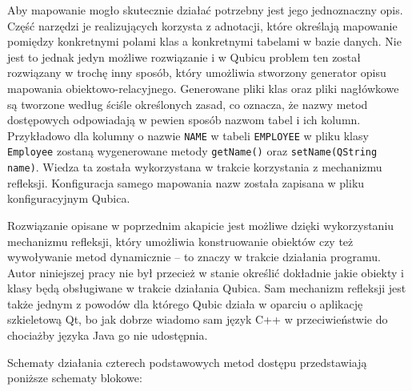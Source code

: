 \documentclass[12pt]{report}
\begin{document}
Aby mapowanie mogło skutecznie działać potrzebny jest jego jednoznaczny opis. Część narzędzi je realizujących korzysta z adnotacji, które określają mapowanie pomiędzy
konkretnymi polami klas a konkretnymi tabelami w bazie danych. Nie jest to jednak jedyn możliwe rozwiązanie i w Qubicu problem ten został rozwiązany w trochę inny sposób,
który umożliwia stworzony generator opisu mapowania obiektowo-relacyjnego. Generowane pliki klas oraz pliki nagłówkowe są tworzone według ściśle określonych zasad, 
co oznacza, że nazwy metod dostępowych odpowiadają w pewien sposób nazwom tabel i ich kolumn. Przykładowo dla kolumny o nazwie {\tt NAME} w tabeli {\tt EMPLOYEE} 
w pliku klasy {\tt Employee} zostaną wygenerowane metody {\tt getName()} oraz {\tt setName(QString name)}. Wie\-dza ta została wykorzystana w trakcie korzystania z 
mechanizmu refleksji. Konfiguracja samego mapowania nazw została zapisana w pliku konfiguracyjnym Qubica.

Rozwiązanie opisane w poprzednim akapicie jest możliwe dzięki wykorzystaniu mechanizmu refleksji, który umożliwia konstruowanie obiektów czy też wywoływanie metod
dynamicznie -- to znaczy w trakcie działania programu. Autor niniejszej pracy nie był przecież w stanie określić dokładnie jakie obiekty i klasy będą obsługiwane w trakcie działania
Qubica. Sam mechanizm refleksji jest także jednym z powodów dla którego Qubic działa w oparciu o aplikację szkieletową Qt, bo jak dobrze wiadomo sam język C++ w
przeciwieństwie do chociażby języka Java go nie udostępnia.

Schematy działania czterech podstawowych metod dostępu przedstawiają po\-niższe schematy blokowe:
\end{document}

